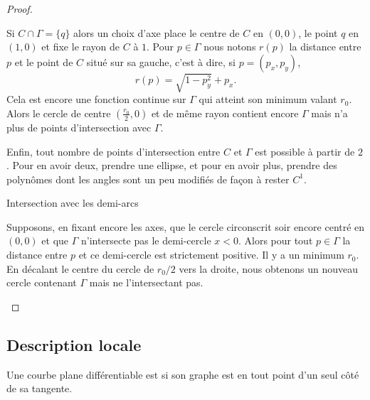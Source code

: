 \begin{proof}
\begin{subproof}
        Si \( C\cap \Gamma=\{ q \}\) alors un choix d'axe place le centre de \( C\) en \( (0,0)\), le point \( q\) en \( (1,0)\) et fixe le rayon de \( C\) à \( 1\). Pour \( p\in \Gamma\) nous notons \( r(p)\) la distance entre \( p\) et le point de \( C\) situé sur sa gauche, c'est à dire, si \( p=(p_x,p_y)\),
        \begin{equation}
            r(p)=\sqrt{ 1-p_y^2 }+p_x.
        \end{equation}
        Cela est encore une fonction continue sur \( \Gamma\) qui atteint son minimum valant \( r_0\). Alors le cercle de centre \( (\frac{ r_0 }{2},0)\) et de même rayon contient encore \( \Gamma\) mais n'a plus de points d'intersection avec \( \Gamma\).

        Enfin, tout nombre de points d'intersection entre \( C\) et \( \Gamma\) est possible à partir de \( 2\). Pour en avoir deux, prendre une ellipse, et pour en avoir plus, prendre des polynômes dont les angles sont un peu modifiés de façon à rester \( C^1\).

    \item[Intersection avec les demi-arcs]

        Supposons, en fixant encore les axes, que le cercle circonscrit soir encore centré en \( (0,0)\) et que \( \Gamma\) n'intersecte pas le demi-cercle \( x<0\). Alors pour tout \( p\in \Gamma\) la distance entre \( p\) et ce demi-cercle est strictement positive. Il y a un minimum \( r_0\). En décalant le centre du cercle de \( r_0/2\) vers la droite, nous obtenons un nouveau cercle contenant \( \Gamma\) mais ne l'intersectant pas.
    \end{subproof}
\end{proof}

\subsection{Description locale}

\begin{definition}      \label{DEFooVQODooJSNYLw}
    Une courbe plane différentiable est  si son graphe est en tout point d'un seul côté de sa tangente.
\end{definition}

